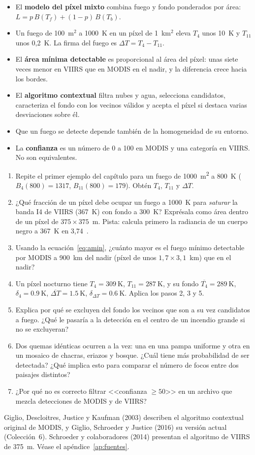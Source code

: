 \resumen

\begin{itemize}
  \item El \textbf{modelo del píxel mixto} combina fuego y fondo ponderados por área:
  $L = p\,B(T_f) + (1-p)\,B(T_b)$.
  \item Un fuego de 100~m$^2$ a 1000~K en un píxel de 1~km$^2$ eleva $T_4$ unos 10~K y $T_{11}$
  unos 0,2~K. La firma del fuego es $\Delta T = T_4 - T_{11}$.
  \item El \textbf{área mínima detectable} es proporcional al área del píxel: unas siete veces
  menor en VIIRS que en MODIS en el nadir, y la diferencia crece hacia los bordes.
  \item El \textbf{algoritmo contextual} filtra nubes y agua, selecciona candidatos, caracteriza
  el fondo con los vecinos válidos y acepta el píxel si destaca varias desviaciones sobre él.
  \item Que un fuego se detecte depende también de la homogeneidad de su entorno.
  \item La \textbf{confianza} es un número de 0 a 100 en MODIS y una categoría en VIIRS. No son
  equivalentes.
\end{itemize}

\ejercicios

\begin{enumerate}
  \item Repite el primer ejemplo del capítulo para un fuego de \SI{1000}{\metre\squared} a
  800~K ($B_4(800) = 1317$, $B_{11}(800) = 179$). Obtén $T_4$, $T_{11}$ y $\Delta T$.
  \item ¿Qué fracción de un píxel debe ocupar un fuego a 1000~K para \emph{saturar} la banda I4
  de VIIRS (367~K) con fondo a 300~K? Exprésala como área dentro de un píxel de
  $375\times375$~m. Pista: calcula primero la radiancia de un cuerpo negro a 367~K en
  3,74~\um.
  \item Usando la ecuación~\eqref{eq:amin}, ¿cuánto mayor es el fuego mínimo detectable por
  MODIS a 900~km del nadir (píxel de unos $1{,}7\times3{,}1$~km) que en el nadir?
  \item Un píxel nocturno tiene $T_4 = \SI{309}{\kelvin}$, $T_{11} = \SI{287}{\kelvin}$, y su
  fondo $\overline{T_4} = \SI{289}{\kelvin}$, $\delta_4 = \SI{0.9}{\kelvin}$,
  $\overline{\Delta T} = \SI{1.5}{\kelvin}$, $\delta_{\Delta T} = \SI{0.6}{\kelvin}$. Aplica los
  pasos 2, 3 y 5.
  \item Explica por qué se excluyen del fondo los vecinos que son a su vez candidatos a fuego.
  ¿Qué le pasaría a la detección en el centro de un incendio grande si no se excluyeran?
  \item Dos quemas idénticas ocurren a la vez: una en una pampa uniforme y otra en un mosaico de
  chacras, eriazos y bosque. ¿Cuál tiene más probabilidad de ser detectada? ¿Qué implica esto
  para comparar el número de focos entre dos paisajes distintos?
  \item ¿Por qué no es correcto filtrar <<confianza $\geq 50$>> en un archivo que mezcla
  detecciones de MODIS y de VIIRS?
\end{enumerate}

\lecturas

Giglio, Descloitres, Justice y Kaufman (2003) describen el algoritmo contextual original de
MODIS, y Giglio, Schroeder y Justice (2016) su versión actual (Colección~6). Schroeder y
colaboradores (2014) presentan el algoritmo de VIIRS de 375~m. Véase el
apéndice~\ref{ap:fuentes}.
